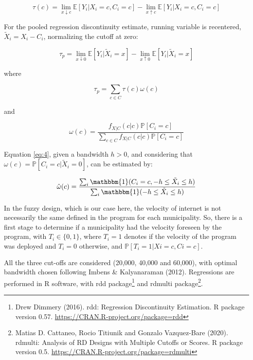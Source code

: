 \documentclass[
  12pt,
]{article}
\begin{document}
\begin{equation}
\tau(c)= \lim\limits_{x \downarrow c}\mathbb{E}[Y_i|X_i=c,C_i=c]-\lim\limits_{x \uparrow c}\mathbb{E}[Y_i|X_i=c,C_i=c]
\label{eq:1}
\end{equation}

For the pooled regression discontinuity estimate, running variable is
recentered, \(\tilde X_i=X_i-C_i\), normalizing the cutoff at zero:

\begin{equation}
\tau_p= \lim\limits_{x \downarrow 0}\mathbb{E}[Y_i| \tilde X_i=x]-\lim\limits_{x \uparrow 0}\mathbb{E}[Y_i|\tilde X_i=x]
\label{eq:2}
\end{equation}

where

\begin{equation}
\tau_p= \sum\limits_{c \in C}\tau(c) \omega(c)
\label{eq:3}
\end{equation}

and

\begin{equation}
\omega(c) = \frac{f_{X|C}(c|c)\mathbb{P}[C_i=c]}{\sum\limits_{c \in C} f_{X|C}(c|c)\mathbb{P}[C_i=c]}
\label{eq:4}
\end{equation}

Equation \ref{eq:4}, given a bandwidth \(h>0\), and considering that
\(\omega(c)=\mathbb{P}[C_i = c|\tilde X_i = 0]\), can be estimated by:

\begin{equation}
 \hat \omega(c) = \frac{\sum_{i} \mathbbm{1} (C_i=c,-h \leq \tilde X_i \leq h) } {\sum_{i} \mathbbm{1} (-h \leq \tilde X_i \leq h)}
\label{eq:5}
\end{equation}

In the fuzzy design, which is our case here, the velocity of internet is
not necessarily the same defined in the program for each municipality.
So, there is a first stage to determine if a municipality had the
velocity foreseen by the program, with \(T_i \in \{0,1\}\), where
\(T_i=1\) denotes if the velocity of the program was deployed and
\(T_i=0\) otherwise, and \(\mathbb{P}[T_i=1 |Xi = c,Ci = c]\).

All the three cut-offs are considered (20,000, 40,000 and 60,000), with
optimal bandwidth chosen following Imbens \& Kalyanaraman (2012).
Regressions are performed in R software, with rdd package\footnote{Drew
  Dimmery (2016). rdd: Regression Discontinuity Estimation. R package
  version 0.57. \url{https://CRAN.R-project.org/package=rdd}} and
rdmulti package\footnote{Matias D. Cattaneo, Rocio Titiunik and Gonzalo
  Vazquez-Bare (2020). rdmulti: Analysis of RD Designs with Multiple
  Cutoffs or Scores. R package version 0.5.
  \url{https://CRAN.R-project.org/package=rdmulti}}.
\end{document}
